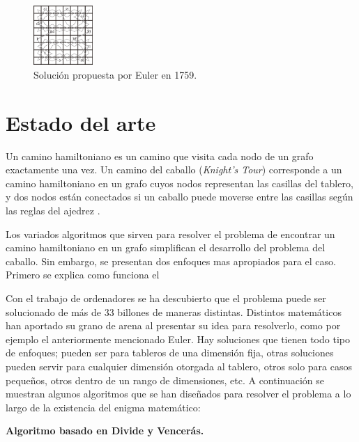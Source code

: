 \documentclass[journal, 10pt]{IEEEtran}
\begin{document}
\begin{figure}[h]

\centering
\includegraphics[width=0.2\textwidth]{figures/EulerKT.png}
\caption{Soluci\'on propuesta por Euler en 1759.}
\label{fig:euler}

\end{figure}


\section{Estado del arte}
Un camino hamiltoniano es un camino que visita cada nodo de un grafo exactamente una vez. Un camino del caballo (\textit{Knight's Tour}) corresponde a un camino hamiltoniano en un grafo cuyos nodos representan las casillas  del tablero, y dos nodos est\'an conectados si un caballo puede moverse entre las casillas seg\'un las reglas del ajedrez \cite{Rosen/2002}.

Los variados algoritmos que sirven para resolver el problema de encontrar un camino hamiltoniano en un grafo simplifican el desarrollo del problema del caballo. Sin embargo, se presentan dos enfoques mas apropiados para el caso. Primero se explica como funciona el 

Con el trabajo de ordenadores se ha descubierto que el problema puede ser solucionado de más de 33 billones de maneras distintas. Distintos matemáticos han aportado su grano de arena al presentar su idea para resolverlo, como por ejemplo el anteriormente mencionado Euler. Hay soluciones que tienen todo tipo de enfoques; pueden ser para tableros de una dimensión fija, otras soluciones pueden servir para cualquier dimensión otorgada al tablero, otros solo para casos pequeños, otros dentro de un rango de dimensiones, etc. A continuación se muestran algunos algoritmos que se han diseñados para resolver el problema a lo largo de la existencia del enigma matemático:

\textbf{Algoritmo basado en Divide y Vencer\'as.}
\end{document}
